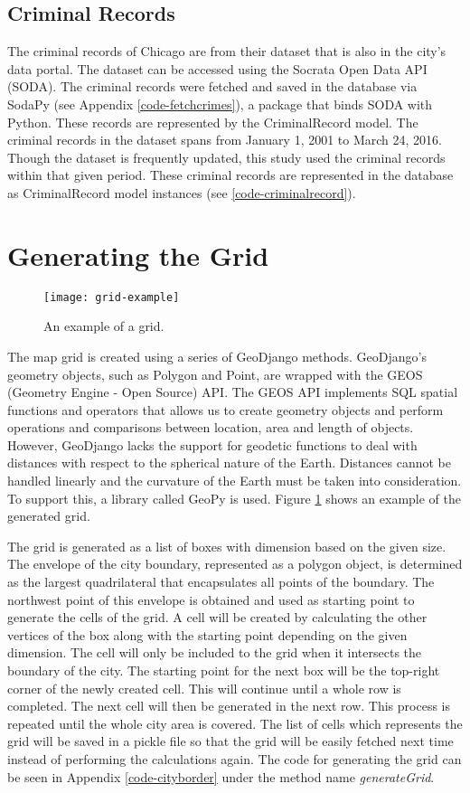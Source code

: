     \subsection{Criminal Records}
        The criminal records of Chicago are from their dataset that is also in the city's data portal. The dataset can be accessed using the Socrata Open Data API (SODA). The criminal records were fetched and saved in the database via SodaPy (see Appendix \ref{code-fetchcrimes}), a package that binds SODA with Python. These records are represented by the CriminalRecord model. The criminal records in the dataset spans from January 1, 2001 to March 24, 2016. Though the dataset is frequently updated, this study used the criminal records within that given period. These criminal records are represented in the database as CriminalRecord model instances (see \ref{code-criminalrecord}).

\section{Generating the Grid}
    \begin{figure}[H]
    \centering
    \texttt{[image: grid-example]}
    \caption{An example of a grid.}
    \label{fig:grid}
    \end{figure}
    The map grid is created using a series of GeoDjango methods. GeoDjango's geometry objects, such as Polygon and Point, are wrapped with the GEOS (Geometry Engine - Open Source) API. The GEOS API implements SQL spatial functions and operators that allows us to create geometry objects and perform operations and comparisons between location, area and length of objects. However, GeoDjango lacks the support for geodetic functions to deal with distances with respect to the spherical nature of the Earth. Distances cannot be handled linearly and the curvature of the Earth must be taken into consideration. To support this, a library called GeoPy is used. Figure \ref{fig:grid} shows an example of the generated grid.

    The grid is generated as a list of boxes with dimension based on the given size. The envelope of the city boundary, represented as a polygon object, is determined as the largest quadrilateral that encapsulates all points of the boundary. The northwest point of this envelope is obtained and used as starting point to generate the cells of the grid. A cell will be created by calculating the other vertices of the box along with the starting point depending on the given dimension. The cell will only be included to the grid when it intersects the boundary of the city. The starting point for the next box will be the top-right corner of the newly created cell. This will continue until a whole row is completed. The next cell will then be generated in the next row. This process is repeated until the whole city area is covered. The list of cells which represents the grid will be saved in a pickle file so that the grid will be easily fetched next time instead of performing the calculations again. The code for generating the grid can be seen in Appendix \ref{code-cityborder} under the method name \textit{generateGrid}.

